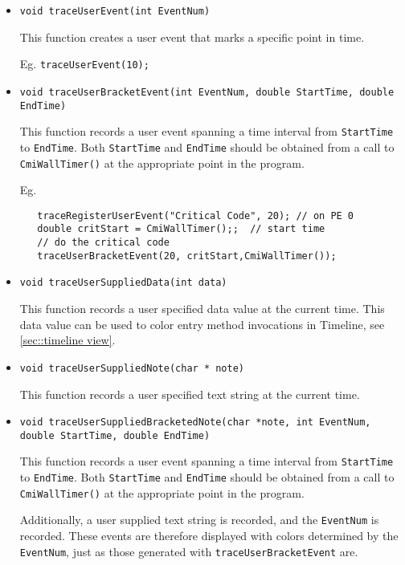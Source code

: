 \begin{itemize}


\item
{\tt void traceUserEvent(int EventNum) }

This function creates a user event that marks a specific point in time.

Eg. {\tt traceUserEvent(10);}

\item
{\tt void traceUserBracketEvent(int EventNum, double StartTime, double EndTime) }

This function records a user event spanning a time interval from {\tt StartTime} to {\tt EndTime}. Both {\tt StartTime} and {\tt EndTime} should be obtained from a call to {\tt CmiWallTimer()} at the appropriate point in the program.

Eg.
\begin{verbatim}
   traceRegisterUserEvent("Critical Code", 20); // on PE 0
   double critStart = CmiWallTimer();;  // start time
   // do the critical code
   traceUserBracketEvent(20, critStart,CmiWallTimer());
\end{verbatim}

\item
{\tt void traceUserSuppliedData(int data) }

This function records a user specified data value at the current
time. This data value can be used to color entry method invocations in
Timeline, see \ref{sec::timeline view}.

\item
{\tt void traceUserSuppliedNote(char * note) }

This function records a user specified text string at the current time.

\item
{\tt void traceUserSuppliedBracketedNote(char *note, int EventNum, double StartTime, double EndTime)}

This function records a user event spanning a time interval from {\tt StartTime} to {\tt EndTime}. Both {\tt StartTime} and {\tt EndTime} should be obtained from a call to {\tt CmiWallTimer()} at the appropriate point in the program.

Additionally, a user supplied text string is recorded, and the  {\tt EventNum} is recorded. These events are therefore displayed with colors determined by the {\tt EventNum}, just as those generated with {\tt traceUserBracketEvent} are.

\end{itemize}

